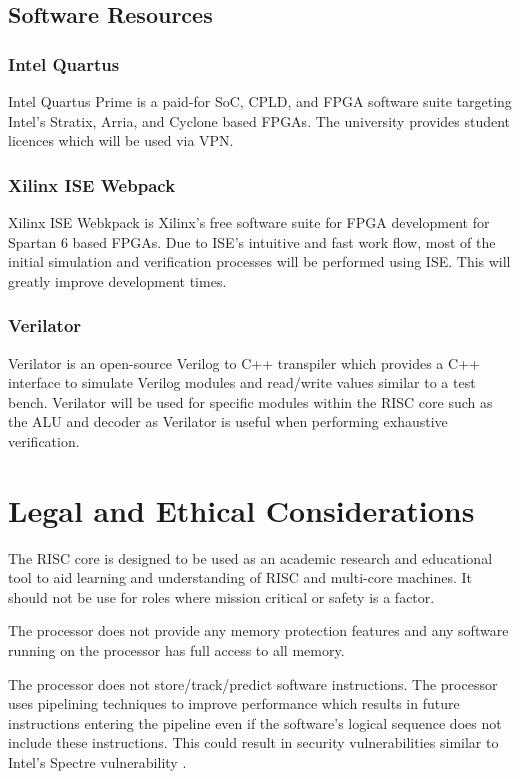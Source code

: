 \documentclass[11pt,a4paper]{report}
\begin{document}
{\subsection{Software Resources}
\subsubsection{Intel Quartus}
Intel Quartus Prime is a paid-for SoC, CPLD, and FPGA software suite targeting Intel's Stratix, Arria, and Cyclone based FPGAs. The university provides student licences which will be used via VPN.


\subsubsection{Xilinx ISE Webpack}
Xilinx ISE Webkpack is Xilinx's free software suite for FPGA development for Spartan 6 based FPGAs.
Due to ISE's intuitive and fast work flow, most of the initial simulation and verification processes will be performed using ISE. This will greatly improve development times.

\subsubsection{Verilator}
Verilator is an open-source Verilog to C++ transpiler which provides a C++ interface to simulate Verilog modules and read/write values similar to a test bench. Verilator will be used for specific modules within the RISC core such as the ALU and decoder as Verilator is useful when performing exhaustive verification.

\section{Legal and Ethical Considerations}
The RISC core is designed to be used as an academic research and educational tool to aid learning and understanding of RISC and multi-core machines. It should not be use for roles where mission critical or safety is a factor. 

The processor does not provide any memory protection features and any software running on the processor has full access to all memory.

The processor does not store/track/predict software instructions. The processor uses pipelining techniques to improve performance which results in future instructions entering the pipeline even if the software's logical sequence does not include these instructions. This could result in security vulnerabilities similar to Intel's Spectre vulnerability \cite{kocher2018spectre}.


}
\end{document}
